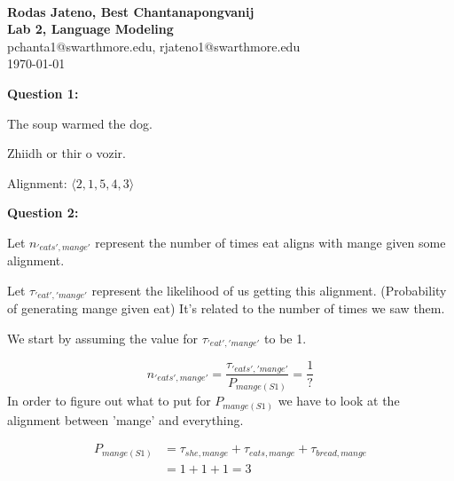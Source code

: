\documentclass[11pt]{article}
\begin{document}
\begin{center}
\\
\vspace{0.5cm}
{\LARGE\bf Rodas Jateno, Best Chantanapongvanij\\
\vspace{0.25cm}
Lab 2, Language Modeling}\\[10pt]
pchanta1@swarthmore.edu, rjateno1@swarthmore.edu\\
\vspace{0.25cm}
\today
\begin{flushleft}
\textbf{Question 1:}
\begin{center}
   
 {\color{brown}The} {\color{blue}soup} {\color{yellow}warmed} {\color{green}the} dog.

{\color{blue}Zhiidh} {\color{brown}or} thir {\color{green}o} {\color{yellow}vozir}.

Alignment: $\langle 2, 1, 5, 4, 3 \rangle$
\end{center}



\bigskip
\textbf{Question 2:} 

Let $n_{'eats', mange'}$ represent the number of times eat aligns with mange given some alignment. 

Let $\tau_{'eat', 'mange'} $ represent the likelihood of us getting this alignment. (Probability of generating mange given eat) It's related to the number of times we saw them. 

We start by assuming the value for $\tau_{'eat', 'mange'}$  to be 1. 

\begin{equation}
    n_{'eats', mange'} = \frac{\tau_{'eats', 'mange'}}{P_{mange(S1)}} = \frac{1}{?}
\end{equation}
In order to figure out what to put for $P_{mange(S1)}$ we have to look at the alignment between 'mange' and everything. 

\begin{equation}
\begin{split}
P_{mange(S1)} & = \tau_{she, mange} + \tau_{eats, mange} + \tau_{bread, mange} \\
       & = 1 + 1 + 1 = 3
\end{split}
\end{equation}



\end{flushleft}
\end{center}
\end{document}
